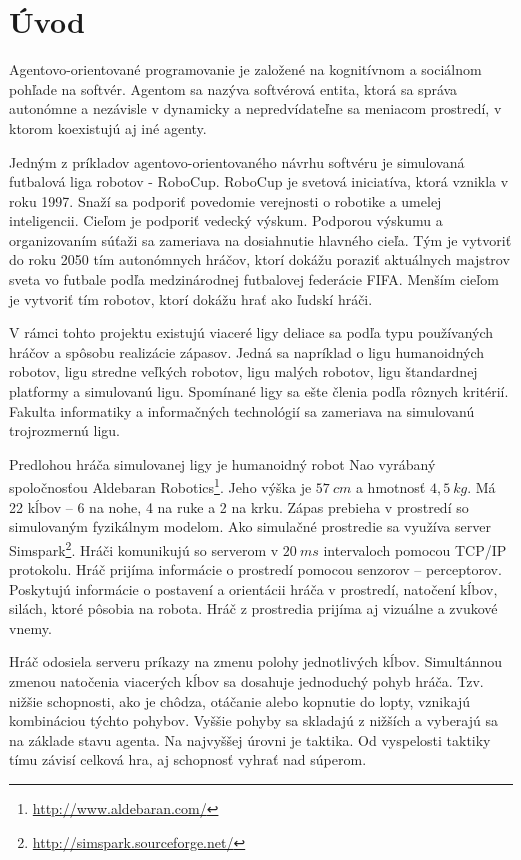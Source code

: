 \section{Úvod}

Agentovo-orientované programovanie \cite{shoham} je založené na kognitívnom a sociálnom pohľade na softvér. Agentom sa nazýva softvérová entita, ktorá sa správa autonómne a nezávisle v dynamicky a nepredvídateľne sa meniacom prostredí, v ktorom koexistujú aj iné agenty.

Jedným z príkladov agentovo-orientovaného návrhu softvéru je simulovaná futbalová liga robotov - RoboCup.
RoboCup \cite{robocup} je svetová iniciatíva, ktorá vznikla v roku 1997. Snaží sa podporiť povedomie verejnosti o robotike a umelej inteligencii. Cieľom je podporiť vedecký výskum. Podporou výskumu a organizovaním súťaži sa zameriava na dosiahnutie hlavného cieľa. Tým je vytvoriť do roku 2050 tím autonómnych hráčov, ktorí dokážu poraziť aktuálnych majstrov sveta vo futbale podľa medzinárodnej futbalovej federácie FIFA. Menším cieľom je vytvoriť tím robotov, ktorí dokážu hrať ako ľudskí hráči. 

V rámci tohto projektu existujú viaceré ligy deliace sa podľa typu používaných hráčov a spôsobu  realizácie  zápasov.  Jedná  sa  napríklad  o ligu  humanoidných  robotov,  ligu  stredne veľkých  robotov,  ligu  malých  robotov,  ligu  štandardnej  platformy  a  simulovanú  ligu. Spomínané  ligy  sa  ešte členia  podľa  rôznych  kritérií. Fakulta informatiky a informačných technológií sa zameriava na simulovanú trojrozmernú ligu. 

Predlohou hráča simulovanej ligy je humanoidný robot Nao vyrábaný spoločnosťou Aldebaran Robotics\footnote{\url{http://www.aldebaran.com/}}. Jeho výška je $57~cm$ a hmotnosť $4,5~kg$. Má 22 kĺbov – 6 na nohe, 4 na ruke a 2 na krku. Zápas prebieha v prostredí so simulovaným fyzikálnym modelom. Ako simulačné prostredie sa využíva server Simspark\footnote{\url{http://simspark.sourceforge.net/}}. Hráči komunikujú so serverom v $20~ms$ intervaloch pomocou TCP/IP protokolu. Hráč prijíma informácie o prostredí pomocou senzorov – perceptorov. Poskytujú informácie o postavení a orientácii hráča v prostredí, natočení kĺbov, silách, ktoré pôsobia na robota. Hráč z prostredia prijíma aj vizuálne a zvukové vnemy. 

Hráč  odosiela  serveru  príkazy  na  zmenu polohy  jednotlivých  kĺbov.  Simultánnou  zmenou  natočenia  viacerých  kĺbov  sa  dosahuje jednoduchý pohyb hráča. Tzv. nižšie schopnosti, ako je chôdza, otáčanie alebo kopnutie do lopty, vznikajú kombináciou týchto pohybov. Vyššie pohyby sa skladajú z nižších a vyberajú sa na základe stavu agenta. Na najvyššej úrovni je taktika. Od vyspelosti taktiky tímu závisí celková hra, aj schopnosť vyhrať nad súperom. 

